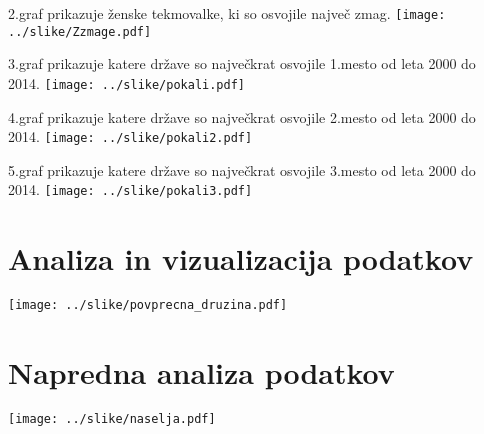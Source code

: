 \documentclass[11pt,a4paper]{article}
\begin{document}
2.graf prikazuje ženske tekmovalke, ki so osvojile največ zmag.
\texttt{[image: ../slike/Zzmage.pdf]}

3.graf prikazuje katere države so največkrat osvojile 1.mesto od leta 2000 do 2014.
\texttt{[image: ../slike/pokali.pdf]}

4.graf prikazuje katere države so največkrat osvojile 2.mesto od leta 2000 do 2014.
\texttt{[image: ../slike/pokali2.pdf]}

5.graf prikazuje katere države so največkrat osvojile 3.mesto od leta 2000 do 2014.
\texttt{[image: ../slike/pokali3.pdf]}


\section{Analiza in vizualizacija podatkov}

\texttt{[image: ../slike/povprecna\_druzina.pdf]}

\section{Napredna analiza podatkov}

\texttt{[image: ../slike/naselja.pdf]}
\end{document}
